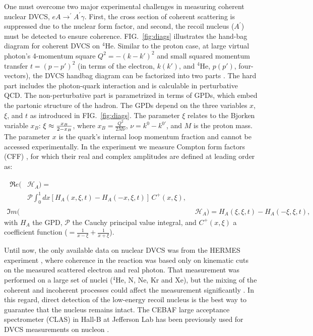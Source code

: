 \documentclass[twocolumn,nofootinbib,showpacs,prl,superscriptaddress,secnumarabic,amssymb,nobibnotes,aps,floatfix]{revtex4}
\begin{document}
One must overcome two major experimental challenges in measuring coherent 
nuclear DVCS, $eA\rightarrow^\prime A^\prime\gamma$. First, the cross section 
of coherent scattering is suppressed due to the nuclear form factor, and 
second, the recoil nucleus ($A^\prime$) must be detected to ensure coherence.  
FIG.~\ref{fig:diags} illustrates the hand-bag diagram for coherent DVCS on 
$^4$He. Similar to the proton case, at large virtual photon's 4-momentum square 
$Q^2=-(k-k')^{2}$ and small squared momentum transfer $t=(p-p')^{2}$ (in terms 
of the electron, $k(k')$, and $^4$He, $p(p')$, four-vectors), the DVCS handbag 
diagram can be factorized into two parts \cite{Freund_Collins,Ji_Osborne}. The 
hard part includes the photon-quark interaction and is calculable in 
perturbative QCD. The non-perturbative part is parametrized in terms of GPDs, 
which embed the partonic structure of the hadron. The GPDs depend on the three 
variables $x$, $\xi$, and $t$ as introduced in FIG.~\ref{fig:diags}. The 
parameter $\xi$ relates to the Bjorken variable $x_{B}$: $\xi\approx 
{{x_B}\over{2-x_B}}$, where $x_B=\frac{Q^2}{2M\nu}$, $\nu=k^0-k^{0\prime}$, and 
$M$ is the proton mass. The parameter $x$ is the quark's internal loop momentum 
fraction and cannot be accessed experimentally. In the experiment we measure 
Compton form factors (CFF) \cite{Guidal:2013rya}, for which their real and 
complex amplitudes are defined at leading order as:

\begin{align}
\begin{split}
\Re e(&\mathcal{H}_{A}) = \\
    &\mathcal{P} 
\int_{0}^{1}dx[H_A(x,\xi,t)-H_A(-x,\xi,t)] \, C^{+}(x,\xi), 
\end{split} \\
\Im m(&\mathcal{H}_{A}) = H_A(\xi,\xi,t)-H_A(-\xi,\xi,t),
\end{align}
with $H_A$ the GPD, $\mathcal{P}$ 
the Cauchy principal value integral, and $C^{+}(x,\xi)$ a coefficient function 
($=  \frac{1}{x-\xi} + \frac{1}{x+\xi}$).

Until now, the only available data on nuclear DVCS was from the HERMES 
experiment \cite{Ellinghaus:2002zw}, where coherence in the reaction was based 
only on kinematic cuts on the measured scattered electron and real photon. That 
measurement was performed on a large set of nuclei ($^4$He, N, Ne, Kr and Xe), 
but the mixing of the coherent and incoherent processes could affect the
measurement significantly \cite{Guzey:2003jh}. In this regard, direct detection 
of the low-energy recoil nucleus is the best way to guarantee that the nucleus 
remains intact. The CEBAF large acceptance spectrometer (CLAS) in Hall-B at 
Jefferson Lab has been previously used for DVCS measurements on nucleon
\cite{Girod:2007aa,Gavalian:2009,Seder:2015,Pisano:2015,Jo:2015ema}.
\end{document}
